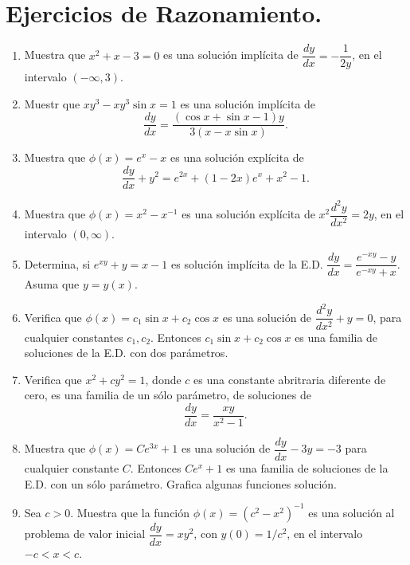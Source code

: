 \documentclass[letterpaper,10pt]{memoir}
\begin{document}
\section{Ejercicios de Razonamiento.} %
\begin{enumerate}
	\item Muestra que \(x^2+x-3=0\) es una solución implícita de \(\dfrac{dy}{dx} =- \dfrac{1}{2y}\), en el intervalo \((- \infty ,3)\).
	\item Muestr que \(xy^3-xy^3 \sin x=1\) es una solución implícita de
		\[
			\dfrac{dy}{dx} = \dfrac{(\cos x+ \sin x-1) y}{3(x-x \sin x)}.
		\]
	\item Muestra que \(\phi (x) =e^x-x\) es una solución explícita de
		\[
			\dfrac{dy}{dx} +y^2=e^{2x} +(1-2x) e^x+x^2-1.
		\]
	\item Muestra que \(\phi (x) =x^2-x^{-1}\) es una solución explícita de \(x^2 \dfrac{d^2y}{dx^2} =2y\), en el intervalo \((0, \infty)\).
	\item Determina, si \(e^{xy} +y=x-1\) es solución implícita de la E.D. \(\dfrac{dy}{dx} = \dfrac{e^{-xy} -y}{e^{-xy} +x}\). Asuma que \(y=y(x)\).
	\item Verifica que \(\phi (x) = c_1 \sin x+c_2 \cos x\) es una solución de \(\dfrac{d^2y}{dx^2} +y=0\), para cualquier constantes \(c_1,c_2\). Entonces \(c_1 \sin x+ c_2 \cos x\) es una familia de soluciones de la E.D. con dos parámetros.
	\item Verifica que \(x^2+cy^2=1\), donde \(c\) es una constante abritraria diferente de cero, es una familia de un sólo parámetro, de soluciones de
		\[
			\dfrac{dy}{dx} = \dfrac{xy}{x^2-1}.
		\]
	\item Muestra que \(\phi (x) =Ce^{3x} +1\) es una solución de \(\dfrac{dy}{dx} -3y=-3\) para cualquier constante \(C\). Entonces \(Ce^x+1\) es una familia de soluciones de la E.D. con un sólo parámetro. Grafica algunas funciones solución.
	\item Sea \(c>0\). Muestra que la función \(\phi (x) =(c^2-x^2) ^{-1}\) es una solución al problema de valor inicial \(\dfrac{dy}{dx} =xy^2\), con \(y(0) =1/c^2\), en el intervalo \(-c <x < c\).
\end{enumerate}
\end{document}
